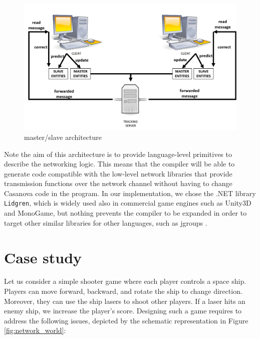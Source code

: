 \begin{figure}
	\centering
	\includegraphics[width = \textwidth]{Figures/masterslave}
	\caption{master/slave architecture}
	\label{fig:masterslave}
\end{figure}

Note the aim of this architecture is to provide language-level primitives to describe the networking logic. This means that the compiler will be able to generate code compatible with the low-level network libraries that provide transmission functions over the network channel without having to change Casanova code in the program. In our implementation, we chose the .NET library \texttt{Lidgren}, which is widely used also in commercial game engines such as Unity3D and MonoGame, but nothing prevents the compiler to be expanded in order to target other similar libraries for other languages, such as jgroups \cite{ban2002jgroups}.

\section{Case study}
Let us consider a simple shooter game where each player controls a space ship. Players can move forward, backward, and rotate the ship to change direction. Moreover, they can use the ship lasers to shoot other players. If a laser hits an enemy ship, we increase the player's score. Designing such a game requires to address the following issues, depicted by the schematic representation in Figure \ref{fig:network_world}:

